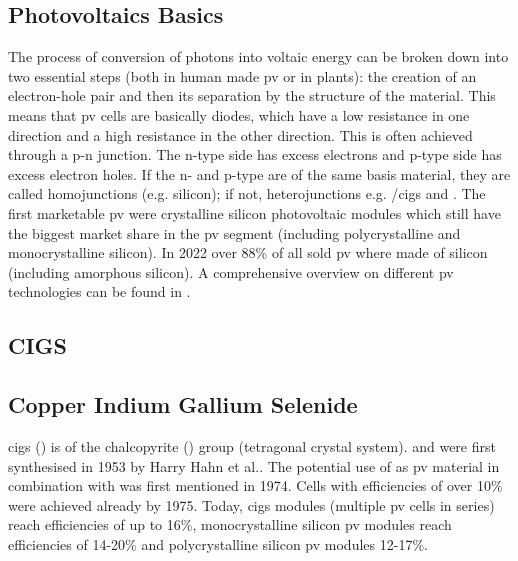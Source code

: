 \subsection{Photovoltaics Basics}
The process of conversion of photons into voltaic energy can be broken down into two essential steps (both in human made \gls{pv} or in plants): 
the creation of an electron-hole pair and then its separation by the structure of the material\cite{markvart2013principles}.
This means that \gls{pv} cells are basically diodes, which have a low resistance in one direction and a high resistance in the other direction. 
This is often achieved through a p-n junction.
The n-type side has excess electrons and p-type side has excess electron holes. 
If the n- and p-type are of the same basis material, they are called homojunctions (e.g. silicon); if not, heterojunctions e.g. /\gls{cigs} and \cite{breitenstein2013understanding}.
%
The first marketable \gls{pv} were crystalline silicon photovoltaic modules which still 
have the biggest market share in the \gls{pv} segment (including polycrystalline and monocrystalline silicon).
In 2022 
over 88\% of all sold \gls{pv} where made of silicon (including amorphous silicon)\cite{breitenstein2013understanding}.
%
A comprehensive overview on different \gls{pv} technologies can be found in \cite{markvart2013principles}.


\subsection{CIGS}
\subsection{Copper Indium Gallium Selenide} 
\gls{cigs} () is of the chalcopyrite () group (tetragonal crystal system). 
 and  were first synthesised in 1953 by Harry Hahn et al.\cite{hahn1953untersuchungen}.
The potential use of  as \gls{pv} material in combination with  was first mentioned in 1974\cite{wagner1974cuinse2}.
Cells with efficiencies of over 10\% were achieved already by 1975\cite{kazmerski1976thin}.
Today, 
\gls{cigs} modules (multiple \gls{pv} cells in series) 
reach efficiencies of up to 16\%\cite{feurer2017cigs},
monocrystalline silicon \gls{pv} modules reach efficiencies of 14-20\%
and polycrystalline silicon \gls{pv} modules 12-17\%\cite{mcevoy2011practical}.

